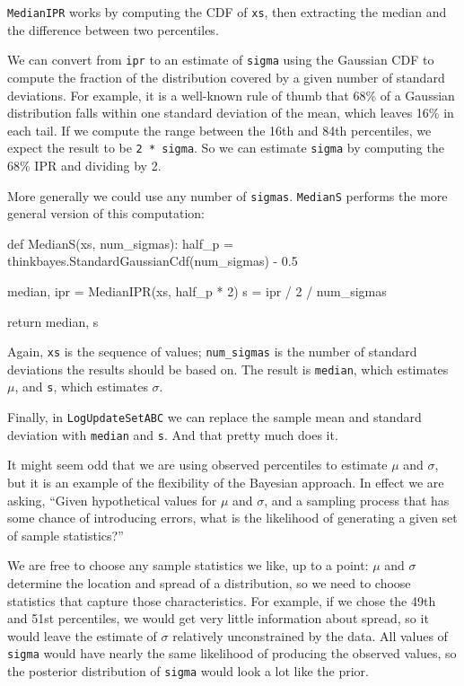 \documentclass[12pt]{book}
\theoremstyle{exercise}
\begin{document}
{\tt MedianIPR} works by computing the CDF of {\tt xs},
then extracting the median and the difference between two
percentiles.

We can convert from {\tt ipr} to an estimate of {\tt sigma} using the
Gaussian CDF to compute the fraction of the distribution covered by a
given number of standard deviations.  For example, it is a well-known
rule of thumb that 68\% of a Gaussian distribution falls within one
standard deviation of the mean, which leaves 16\% in each tail.  If we
compute the range between the 16th and 84th percentiles, we expect the
result to be {\tt 2 * sigma}.  So we can estimate {\tt sigma} by
computing the 68\% IPR and dividing by 2.

More generally we could use any number of {\tt sigmas}.
{\tt MedianS} performs the more general version of this
computation:

\begin{code}
def MedianS(xs, num_sigmas):
    half_p = thinkbayes.StandardGaussianCdf(num_sigmas) - 0.5

    median, ipr = MedianIPR(xs, half_p * 2)
    s = ipr / 2 / num_sigmas

    return median, s
\end{code}

Again, {\tt xs} is the sequence of values; \verb"num_sigmas" is the
number of standard deviations the results should be based on.  The
result is {\tt median}, which estimates $\mu$, and {\tt s}, which 
estimates $\sigma$.

Finally, in {\tt LogUpdateSetABC} we can replace the sample mean and
standard deviation with {\tt median} and {\tt s}.  And that pretty
much does it.

It might seem odd that we are using observed percentiles to
estimate $\mu$ and $\sigma$, but it is an example of the
flexibility of the Bayesian approach.  In effect we are asking,
``Given hypothetical values for $\mu$ and $\sigma$, and
a sampling process that has some chance of introducing errors,
what is the likelihood of generating a given set of sample
statistics?''

We are free to choose any sample statistics we like, up to a point:
$\mu$ and $\sigma$ determine the location and spread of
a distribution, so we need to choose statistics that capture those
characteristics.  For example, if we chose the 49th and 51st percentiles,
we would get very little information about spread, so it
would leave the estimate of $\sigma$ relatively unconstrained
by the data.  All values of {\tt sigma} would have nearly the
same likelihood of producing the observed values, so the posterior
distribution of {\tt sigma} would look a lot like the
prior.
\end{document}
